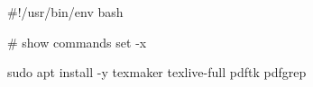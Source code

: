 #!/usr/bin/env bash

# show commands
set -x

sudo apt install -y texmaker texlive-full pdftk pdfgrep
